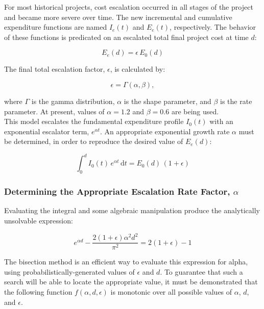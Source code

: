 \documentclass{article}
\begin{document}
For most historical projects, cost escalation occurred in all stages of the project and became more severe over time.
The new incremental and cumulative expenditure functions are named $I_e(t)$ and $E_e(t)$, respectively.
The behavior of these functions is predicated on an escalated total final project cost at time $d$:

\begin{equation}
  E_e(d) = \epsilon \, E_0(d)
\end{equation}

The final total escalation factor, $\epsilon$, is calculated by:

\begin{equation*}
  \epsilon = \Gamma \left( \alpha, \beta \right),
\end{equation*}

where $\Gamma$ is the gamma distribution, $\alpha$ is the shape parameter, and $\beta$ is the rate parameter. At present, values of $\alpha = 1.2$ and $\beta = 0.6$ are being used.\\

This model escalates the fundamental expenditure profile $I_0(t)$ with an exponential escalator term, $e^{\alpha t}$.
An appropriate exponential growth rate $\alpha$ must be determined, in order to reproduce the desired value of $E_e(d)$:

\begin{equation}
  \int_0^d \! {I_0(t) \, e^{\alpha t} \, \mathrm{d}t} = E_0(d) \, \left( 1 + \epsilon \right)
\end{equation}

\subsubsection{Determining the Appropriate Escalation Rate Factor, $\alpha$}

Evaluating the integral and some algebraic manipulation produce the analytically unsolvable expression:

\begin{equation} \label{non-an}
  e^{\alpha d} - \frac{2 (1 + \epsilon) {\alpha}^2 d^2}{\pi^2} = 2 (1 + \epsilon) - 1
\end{equation}

The bisection method is an efficient way to evaluate this expression for alpha, using probabilistically-generated values of $\epsilon$ and $d$.
To guarantee that such a search will be able to locate the appropriate value, it must be demonstrated that the following function $f(\alpha, d, \epsilon)$ is monotonic over all possible values of $\alpha$, $d$, and $\epsilon$.
\end{document}
